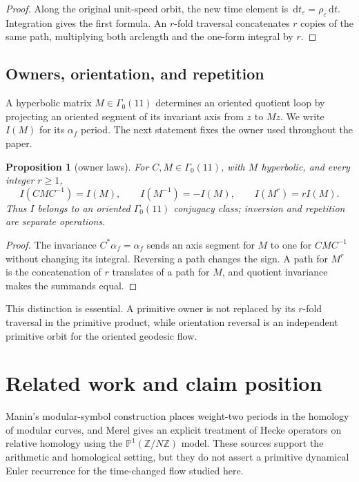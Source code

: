 \documentclass[11pt]{article}
\newtheorem{proposition}[theorem]{Proposition}
\theoremstyle{definition}
\theoremstyle{remark}
\newcommand{\G}{\Gamma_0(11)}
\newcommand{\e}{\varepsilon}
\newcommand{\dd}{\,\mathrm d}
\begin{document}
\begin{proof}
Along the original unit-speed orbit, the new time element is $\dd t_\e=\rho_\e\dd t$. Integration gives the first formula. An $r$-fold traversal concatenates $r$ copies of the same path, multiplying both arclength and the one-form integral by $r$.
\end{proof}

\subsection{Owners, orientation, and repetition}

A hyperbolic matrix $M\in\G$ determines an oriented quotient loop by projecting an oriented segment of its invariant axis from $z$ to $Mz$. We write $I(M)$ for its $\alpha_f$ period. The next statement fixes the owner used throughout the paper.

\begin{proposition}[owner laws]\label{prop:owner}
For $C,M\in\G$, with $M$ hyperbolic, and every integer $r\geq1$,
\[
I(CMC^{-1})=I(M),\qquad I(M^{-1})=-I(M),\qquad I(M^r)=rI(M).
\]
Thus $I$ belongs to an oriented $\G$ conjugacy class; inversion and repetition are separate operations.
\end{proposition}

\begin{proof}
The invariance $C^*\alpha_f=\alpha_f$ sends an axis segment for $M$ to one for $CMC^{-1}$ without changing its integral. Reversing a path changes the sign. A path for $M^r$ is the concatenation of $r$ translates of a path for $M$, and quotient invariance makes the summands equal.
\end{proof}

This distinction is essential. A primitive owner is not replaced by its $r$-fold traversal in the primitive product, while orientation reversal is an independent primitive orbit for the oriented geodesic flow.

\section{Related work and claim position}

Manin's modular-symbol construction places weight-two periods in the homology of modular curves, and Merel gives an explicit treatment of Hecke operators on relative homology using the $\mathbb P^1(\mathbb Z/N\mathbb Z)$ model.
\citep[Introduction and Sections~1--2]{merel1991}
These sources support the arithmetic and homological setting, but they do not assert a primitive dynamical Euler recurrence for the time-changed flow studied here.
\end{document}
